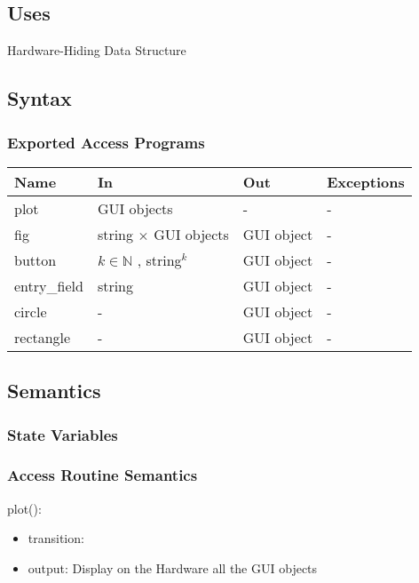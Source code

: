 \documentclass[12pt, titlepage]{article}
\begin{document}
\subsection{Uses}
Hardware-Hiding
Data Structure
\subsection{Syntax}

\subsubsection{Exported Access Programs}

\begin{center}
\begin{tabular}{p{2cm} p{4cm} p{4cm} p{2cm}}
\hline
\textbf{Name} & \textbf{In} & \textbf{Out} & \textbf{Exceptions} \\
\hline
plot & GUI objects & - & - \\
fig & string $\times$ GUI objects &  GUI object & - \\
button & $k \in \mathbb{N}$ , {string}$^{k}$ &  GUI object & - \\
entry{\_}field & string &  GUI object & - \\
circle & - &  GUI object & - \\
rectangle& - & GUI object & - \\
\hline
\end{tabular}
\end{center}

\subsection{Semantics}

\subsubsection{State Variables}


\subsubsection{Access Routine Semantics}

\noindent plot():
\begin{itemize}
\item transition:
\item output: Display on the Hardware all the GUI objects 
\end{itemize}
\end{document}
